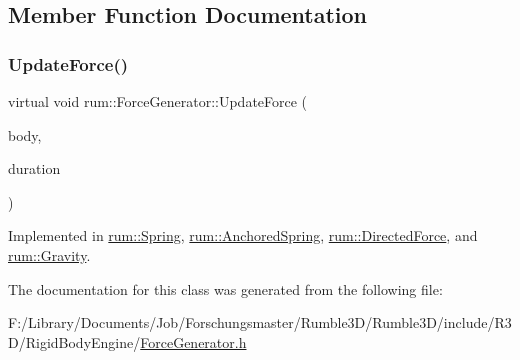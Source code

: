 \subsection{Member Function Documentation}
\mbox{\label{classrum_1_1_force_generator_a6b038c9a39e4cf64b2dcf2741804a824}} 
\subsubsection{\texorpdfstring{Update\+Force()}{UpdateForce()}}
{\footnotesize\ttfamily virtual void rum\+::\+Force\+Generator\+::\+Update\+Force (\begin{DoxyParamCaption}\item[{\hyperlink{classrum_1_1_rigid_body}{Rigid\+Body} $\ast$}]{body,  }\item[{\hyperlink{namespacerum_a7e8cca23573d5eaead0f138cbaa4862c}{real}}]{duration }\end{DoxyParamCaption})\hspace{0.3cm}{\ttfamily [pure virtual]}}



Implemented in \hyperlink{classrum_1_1_spring_ac9c58b1740f347199669132722b998af}{rum\+::\+Spring}, \hyperlink{classrum_1_1_anchored_spring_a7fd4b23ad409fbb678ecace8e99fed68}{rum\+::\+Anchored\+Spring}, \hyperlink{classrum_1_1_directed_force_a79b53d849f80fb69ca1fa42ea43829b4}{rum\+::\+Directed\+Force}, and \hyperlink{classrum_1_1_gravity_a721c721904536378636143b21486ea2c}{rum\+::\+Gravity}.



The documentation for this class was generated from the following file\+:\begin{DoxyCompactItemize}
\item 
F\+:/\+Library/\+Documents/\+Job/\+Forschungsmaster/\+Rumble3\+D/\+Rumble3\+D/include/\+R3\+D/\+Rigid\+Body\+Engine/\hyperlink{_force_generator_8h}{Force\+Generator.\+h}\end{DoxyCompactItemize}
